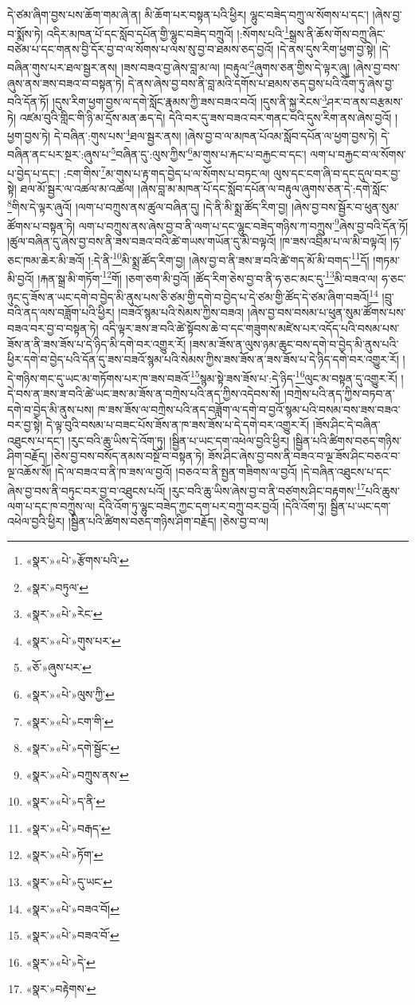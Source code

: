 དེ་ཙམ་ཞིག་བྱས་པས་ཆོག་གམ་ཞེ་ན། མི་ཆོག་པར་བསྟན་པའི་ཕྱིར། ལྷུང་བཟེད་བཀྲུ་ལ་སོགས་པ་དང་། །ཞེས་བྱ་བ་སྨོས་ཏེ། འདིར་མཁན་པོ་དང་སློབ་དཔོན་གྱི་ལྷུང་བཟེད་བཀྲུའོ། །:སོགས་པའི་\footnote{«སྣར་»«པེ་»རྩོགས་པའི་}སྒྲས་ནི་ཆོས་གོས་བཀྲུ་ཞིང་བཙེམ་པ་དང་གནས་བྱི་དོར་བྱ་བ་ལ་སོགས་པ་ལས་སུ་བྱ་བ་ཐམས་ཅད་བྱའོ། །དེ་ནས་དུས་རིག་ཕྱག་བྱ་སྟེ། །དེ་བཞིན་གུས་པར་ཐལ་སྦྱར་ནས། །ཟས་བཟའ་བྱ་ཞེས་བླ་མ་ལ། །བརྟུལ་\footnote{«སྣར་»བཏུལ་}ཞུགས་ཅན་གྱིས་དེ་ལྟར་ཞུ། །ཞེས་བྱ་བས་ཞུས་ནས་ཟས་བཟའ་བ་བསྟན་ཏེ། དེ་ནས་ཞེས་བྱ་བས་ནི་བླ་མའི་དགོས་པ་ཐམས་ཅད་བྱས་པའི་འོག་ཏུ་ཞེས་བྱ་བའི་དོན་ཏོ། །དུས་རིག་ཕྱག་བྱས་ལ་དགེ་སློང་རྣམས་ཀྱི་ཟས་བཟའ་བའོ། །དུས་ནི་སྐྱ་རེངས་\footnote{«སྣར་»«པེ་»རེང་}ཤར་བ་ནས་བརྩམས་ཏེ། འཛམ་བུའི་གླིང་གི་ཉི་མ་དྲོས་མན་ཆད་དེ། དེའི་བར་དུ་ཟས་བཟའ་བར་གནང་བའི་དུས་རིག་ནས་ཞེས་བྱའོ། །ཕྱག་བྱས་ཏེ། དེ་བཞིན་:གུས་པས་\footnote{«སྣར་»«པེ་»གུས་པར་}ཐལ་སྦྱར་ནས། །ཞེས་བྱ་བ་ལ་མཁན་པོའམ་སློབ་དཔོན་ལ་ཕྱག་བྱས་ཏེ། དེ་བཞིན་ནང་པར་སྔར་:ཞུས་པ་\footnote{«ཅོ་»ཞུས་པར་}བཞིན་དུ་:ལུས་ཀྱིས་\footnote{«སྣར་»«པེ་»ལུས་ཀྱི་}མ་གུས་པ་རྐང་པ་བརྐྱང་བ་དང་། ལག་པ་བརྐྱང་བ་ལ་སོགས་པ་བྱེད་པ་དང་། :ངག་གིས་\footnote{«སྣར་»«པེ་»ངག་གི་}མ་གུས་པ་རྟ་གད་བྱེད་པ་ལ་སོགས་པ་བཏང་ལ། ལུས་དང་ངག་ཞི་བ་དང་དུལ་བར་བྱ་སྟེ། ཐལ་མོ་སྦྱར་ལ་འཚལ་མ་འཚལ། །ཞེས་བླ་མ་མཁན་པོ་དང་སློབ་དཔོན་ལ་བརྟུལ་ཞུགས་ཅན་དེ་:དགེ་སློང་\footnote{«སྣར་»«པེ་»དགེ་སྦྱོང་}གིས་དེ་ལྟར་ཞུའོ། །ལག་པ་བཀྲུས་ནས་ཚུལ་བཞིན་དུ། །དེ་ནི་མི་སྨྲ་ཚོད་རིག་བྱ། །ཞེས་བྱ་བས་སྦྱོར་བ་ཕུན་སུམ་ཚོགས་པ་བསྟན་ཏེ། ལག་པ་བཀྲུས་ནས་ཞེས་བྱ་བ་ནི་ལག་པ་དང་ལྷུང་བཟེད་གཉིས་ཀ་བཀྲུས་\footnote{«སྣར་»«པེ་»བཀྲུས་ནས་}ཞེས་བྱ་བའི་དོན་ཏོ། །ཚུལ་བཞིན་དུ་ཞེས་བྱ་བས་ནི་ཟས་བཟའ་བའི་ཚེ་གཡས་གཡོན་དུ་མི་བལྟའོ། །ཁ་ཟས་འབྲིམ་པ་ལ་མི་བལྟའོ། །ཧ་ཅང་ཁམ་ཆེར་མི་ཟའོ། །:དེ་ནི་\footnote{«སྣར་»«པེ་»ད་ནི་}མི་སྨྲ་ཚོད་རིག་བྱ། །ཞེས་བྱ་བ་ནི་ཟས་ཟ་བའི་ཚེ་གད་མོ་མི་བགད་\footnote{«སྣར་»«པེ་»བརྒད་}དོ། །གཏམ་མི་བྱའོ། །རྐན་སྒྲ་མི་གཏོག་\footnote{«སྣར་»«པེ་»ཏོག་}གོ། །ཅག་ཅག་མི་བྱའོ། །ཚོད་རིག་ཅེས་བྱ་བ་ནི་ཧ་ཅང་མང་དུ་\footnote{«སྣར་»«པེ་»དུ་ཡང་}མི་བཟའ་ལ། ཧ་ཅང་ཉུང་དུ་ཟོས་ན་ཡང་དགེ་བ་བྱེད་མི་ནུས་པས་ཅི་ཙམ་གྱི་དགེ་བ་བྱེད་པ་དེ་ཙམ་གྱི་ཚོད་དེ་ཙམ་ཞིག་བཟའོ།\footnote{«སྣར་»«པེ་»བཟའ་བོ།} །བྲུ་བའི་ནད་ལས་བཟློག་པའི་ཕྱིར། །བཟའོ་སྙམ་པའི་སེམས་ཀྱིས་བཟའ། །ཞེས་བྱ་བས་བསམ་པ་ཕུན་སུམ་ཚོགས་པས་བཟའ་བར་བྱ་བ་བསྟན་ཏེ། འདི་ལྟར་ཟས་ཟ་བའི་ཚེ་སྟོབས་ཆེ་བ་དང་གཟུགས་མཛེས་པར་འདོད་པའི་བསམ་པས་ཟོས་ན་ནི་ཟས་ཟོས་པ་དེ་ཉིད་མི་དགེ་བར་འགྱུར་རོ། །ཟས་མ་ཟོས་ན་ལུས་ཉམ་ཆུང་བས་དགེ་བ་བྱེད་མི་ནུས་པའི་ཕྱིར་དགེ་བ་བྱེད་པའི་དོན་དུ་ཟས་བཟའོ་སྙམ་པའི་སེམས་ཀྱིས་ཟས་ཟོས་ན་ཟས་ཟོས་པ་དེ་ཉིད་དགེ་བར་འགྱུར་རོ། །དེ་གཉིས་གང་དུ་ཡང་མ་གཏོགས་པར་ཁ་ཟས་བཟའོ་\footnote{«སྣར་»«པེ་»བཟའ་བོ་}སྙམ་སྟེ་ཟས་ཟོས་པ་:དེ་ཉིད་\footnote{«སྣར་»«པེ་»དེ་}ལུང་མ་བསྟན་དུ་འགྱུར་རོ། །དེ་བས་ན་ཟས་ཟ་བའི་ཚེ་ཡང་ཟས་མ་ཟོས་ན་བཀྲེས་པའི་ནད་ཀྱིས་འདེབས་སོ། །བཀྲེས་པའི་ནད་ཀྱིས་བཏབ་ན་དགེ་བ་བྱེད་མི་ནུས་པས། ཁ་ཟས་ཟོས་ལ་བཀྲེས་པའི་ནད་བཟློག་ལ་དགེ་བ་བྱའོ་སྙམ་པའི་བསམ་བས་ཟས་བཟའ་བར་བྱ་སྟེ། དེ་ལྟ་བུའི་བསམ་པ་བཟང་པོས་ཟོས་ན་ཁ་ཟས་ཟོས་པ་དེ་དགེ་བར་འགྱུར་རོ། །ཟོས་ཤིང་དེ་བཞིན་འཐུངས་པ་དང་། །རུང་བའི་ཆུ་ཡིས་དེ་འོག་ཏུ། །སྦྱིན་པ་ཡང་དག་འཕེལ་བྱའི་ཕྱིར། །སྦྱིན་པའི་ཚིགས་བཅད་གཉིས་ཤིག་བརྗོད། །ཅེས་བྱ་བས་བསོད་ནམས་བསྔོ་བ་བསྟན་ཏེ། ཟོས་ཤིང་ཞེས་བྱ་བས་ནི་བཟའ་བ་ལྔ་ཟོས་ཤིང་བཅའ་བ་ལྔ་འཆོས་སོ། །དེ་ལ་བཟའ་བ་ནི་ཁ་ཟས་ལ་བྱའོ། །བཅའ་བ་ནི་སྤྱན་གཟིགས་ལ་བྱའོ། །དེ་བཞིན་འཐུངས་པ་དང་ཞེས་བྱ་བས་ནི་བཏུང་བར་བྱ་བ་འཐུངས་པའོ། །རུང་བའི་ཆུ་ཡིས་ཞེས་བྱ་བ་ནི་བཙགས་ཤིང་བརྟགས་\footnote{«སྣར་»བརྟེགས་}པའི་ཆུས་ལག་པ་དང་ཁ་བཀྲུས་ལ། དེའི་འོག་ཏུ་ལྷུང་བཟེད་ཀྱང་དག་པར་བཀྲུ་བར་བྱའོ། །དེའི་འོག་ཏུ། སྦྱིན་པ་ཡང་དག་འཕེལ་བྱའི་ཕྱིར། །སྦྱིན་པའི་ཚིགས་བཅད་གཉིས་ཤིག་བརྗོད། །ཅེས་བྱ་བ་ལ། 